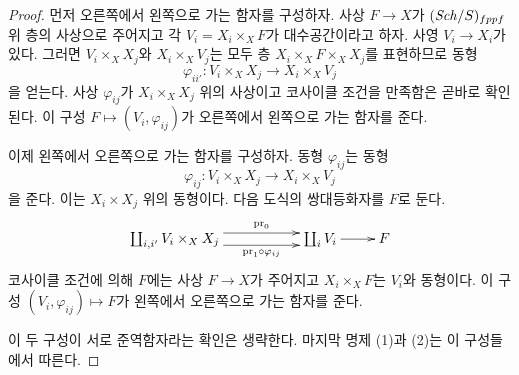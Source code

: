 \begin{proof}
먼저 오른쪽에서 왼쪽으로 가는 함자를 구성하자.
사상 $F\to X$가 $(\mathit{Sch}/S)_{fppf}$ 위 층의 사상으로 주어지고 각
$V_i=X_i\times_XF$가 대수공간이라고 하자. 사영 $V_i\to X_i$가 있다.
그러면 $V_i\times_XX_j$와 $X_i\times_XV_j$는 모두 층
$X_i\times_XF\times_XX_j$를 표현하므로 동형
$$
\varphi_{ii'} : V_i \times_X X_j \to X_i \times_X V_j
$$
을 얻는다. 사상 $\varphi_{ij}$가 $X_i\times_XX_j$ 위의 사상이고
코사이클 조건을 만족함은 곧바로 확인된다. 이 구성
$F\mapsto(V_i,\varphi_{ij})$가 오른쪽에서 왼쪽으로 가는 함자를 준다.

\medskip\noindent
이제 왼쪽에서 오른쪽으로 가는 함자를 구성하자. 동형
$\varphi_{ij}$는 동형
$$
\varphi_{ij} : V_i \times_X X_j \longrightarrow X_i \times_X V_j
$$
을 준다. 이는
$X_i\times X_j$ 위의 동형이다. 다음 도식의 쌍대등화자를 $F$로 둔다.
$$
\xymatrix{
\coprod_{i, i'} V_i \times_X X_j
\ar@<1ex>[rr]^-{\text{pr}_0}
\ar@<-1ex>[rr]_-{\text{pr}_1 \circ \varphi_{ij}}
& &
\coprod_i V_i \ar[r]
&
F
}
$$
코사이클 조건에 의해 $F$에는 사상 $F\to X$가 주어지고
$X_i\times_XF$는 $V_i$와 동형이다. 이 구성
$(V_i,\varphi_{ij})\mapsto F$가 왼쪽에서 오른쪽으로 가는 함자를 준다.

\medskip\noindent
이 두 구성이 서로 준역함자라는 확인은 생략한다. 마지막 명제 (1)과
(2)는 이 구성들에서 따른다.
\end{proof}












